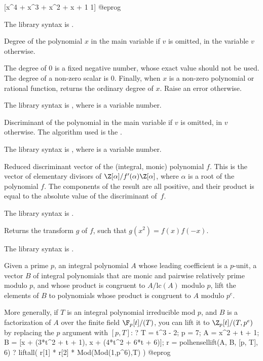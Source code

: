 [x^4 + x^3 + x^2 + x + 1 1]
@eprog

The library syntax is .

\label{se:poldegree}
Degree of the polynomial $x$ in the main variable if $v$ is omitted, in
the variable $v$ otherwise.

The degree of $0$ is a fixed negative number, whose exact value should not
be used. The degree of a non-zero scalar is $0$. Finally, when $x$ is a
non-zero polynomial or rational function, returns the ordinary degree of
$x$. Raise an error otherwise.

The library syntax is , where  is a variable number.

\label{se:poldisc}
Discriminant of the polynomial
 in the main variable if $v$ is omitted, in $v$ otherwise. The
algorithm used is the .

The library syntax is , where  is a variable number.

\label{se:poldiscreduced}
Reduced discriminant vector of the
(integral, monic) polynomial $f$. This is the vector of elementary divisors
of $\Z[\alpha]/f'(\alpha)\Z[\alpha]$, where $\alpha$ is a root of the
polynomial $f$. The components of the result are all positive, and their
product is equal to the absolute value of the discriminant of~$f$.

The library syntax is .

\label{se:polgraeffe}
Returns the  transform $g$ of $f$, such that $g(x^2) = f(x)
f(-x)$.

The library syntax is .

\label{se:polhensellift}
Given a prime $p$, an integral polynomial $A$ whose leading coefficient
is a $p$-unit, a vector $B$ of integral polynomials that are monic and
pairwise relatively prime modulo $p$, and whose product is congruent to
$A/\text{lc}(A)$ modulo $p$, lift the elements of $B$ to polynomials whose
product is congruent to $A$ modulo $p^e$.

More generally, if $T$ is an integral polynomial irreducible mod $p$, and
$B$ is a factorization of $A$ over the finite field $\F_p[t]/(T)$, you can
lift it to $\Z_p[t]/(T, p^e)$ by replacing the $p$ argument with $[p,T]$:
\bprog
? { T = t^3 - 2; p = 7; A = x^2 + t + 1;
    B = [x + (3*t^2 + t + 1), x + (4*t^2 + 6*t + 6)];
    r = polhensellift(A, B, [p, T], 6) }
? liftall( r[1] * r[2] * Mod(Mod(1,p^6),T) )
@eprog

